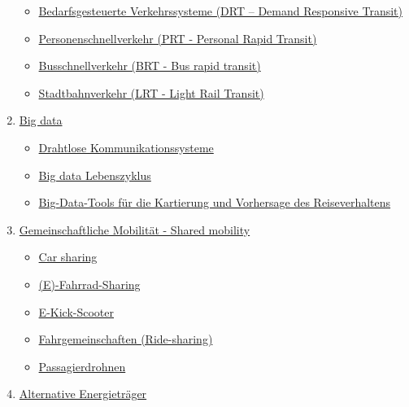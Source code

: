 \documentclass[
]{book}
\providecommand{\tightlist}{%
  \setlength{\itemsep}{0pt}\setlength{\parskip}{0pt}}
\begin{document}
\begin{enumerate}
  \begin{itemize}
  \tightlist
  \item
    \protect\hyperlink{drt}{Bedarfsgesteuerte Verkehrssysteme (DRT -- Demand Responsive Transit)}\\
  \item
    \protect\hyperlink{prt}{Personenschnellverkehr (PRT - Personal Rapid Transit)}\\
  \item
    \protect\hyperlink{brt}{Busschnellverkehr (BRT - Bus rapid transit)}\\
  \item
    \protect\hyperlink{lrt}{Stadtbahnverkehr (LRT - Light Rail Transit)}\\
  \end{itemize}
\item
  \protect\hyperlink{big}{Big data}

  \begin{itemize}
  \tightlist
  \item
    \protect\hyperlink{wireless_com}{Drahtlose Kommunikationssysteme}\\
  \item
    \protect\hyperlink{bd_life}{Big data Lebenszyklus}
  \item
    \protect\hyperlink{bd_tool_maping}{Big-Data-Tools für die Kartierung und Vorhersage des Reiseverhaltens}\\
  \end{itemize}
\item
  \protect\hyperlink{shared}{Gemeinschaftliche Mobilität - Shared mobility}

  \begin{itemize}
  \tightlist
  \item
    \protect\hyperlink{car_sharing}{Car sharing}\\
  \item
    \protect\hyperlink{bike_sharing}{(E)-Fahrrad-Sharing}\\
  \item
    \protect\hyperlink{scooters}{E-Kick-Scooter}\\
  \item
    \protect\hyperlink{ride_hailing}{Fahrgemeinschaften (Ride-sharing)}\\
  \item
    \protect\hyperlink{passenger_drones}{Passagierdrohnen}
  \end{itemize}
\item
  \protect\hyperlink{alternative}{Alternative Energieträger}


\end{enumerate}
\end{document}
